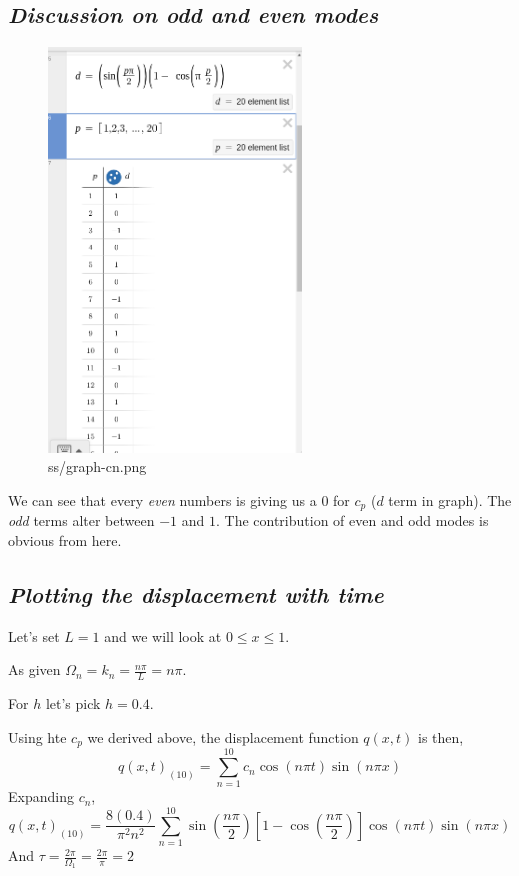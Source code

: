 \documentclass[letter]{article}
\begin{document}
\subsection*{\emph{Discussion on odd and even modes}}
\begin{figure}[H]
	\centering
	\includegraphics[width=0.6\textwidth]{ss/graph-cn.png}
	\caption{ss/graph-cn.png}
	\label{fig:ss-graph-cn-png}
\end{figure}
We can see that every \emph{even} numbers is giving us a $0$ for $c_p$ ($d$ term in graph). The \emph{odd} terms alter between $-1$ and $1$. The contribution of even and odd modes is obvious from here.   
\subsection*{\emph{Plotting the displacement with time}}
Let's set $L = 1$ and we will look at $0 \le  x \le 1$. 

As given $\Omega_n = k_n = \frac{n\pi}{L} = n \pi $. 

For $h$ let's pick $h = 0.4$. 

Using hte $c_p$ we derived above, the displacement function $q(x,t)$ is then, 
\[
	q(x,t)_{(10)}= 
\sum_{n=1}^{10} c_n \cos ( n \pi t) \sin(n \pi x)
\] 
Expanding $c_n$, 
\[
q(x,t)_{(10)} = \frac{8 (0.4)}{\pi ^2 n^2 } 
\sum_{n=1}^{10} \sin \left(\frac{n \pi }{2}\right) 
\left[ 
1 - \cos \left(\frac{n \pi }{2}\right)
\right] \cos \left( n \pi t\right) \sin (n \pi x)
\]
And $\tau = \frac{2\pi}{\Omega_1} = \frac{2 \pi }{\pi } = 2$
\end{document}

